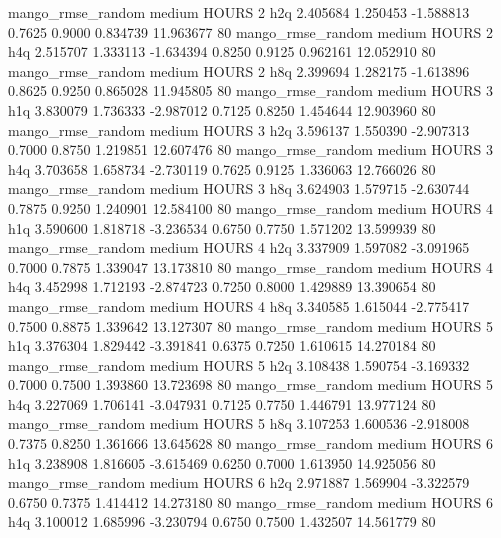 mango_rmse_random     medium    HOURS                 2                  h2q  2.405684 1.250453 -1.588813 0.7625 0.9000  0.834739   11.963677 80
mango_rmse_random     medium    HOURS                 2                  h4q  2.515707 1.333113 -1.634394 0.8250 0.9125  0.962161   12.052910 80
mango_rmse_random     medium    HOURS                 2                  h8q  2.399694 1.282175 -1.613896 0.8625 0.9250  0.865028   11.945805 80
mango_rmse_random     medium    HOURS                 3                  h1q  3.830079 1.736333 -2.987012 0.7125 0.8250  1.454644   12.903960 80
mango_rmse_random     medium    HOURS                 3                  h2q  3.596137 1.550390 -2.907313 0.7000 0.8750  1.219851   12.607476 80
mango_rmse_random     medium    HOURS                 3                  h4q  3.703658 1.658734 -2.730119 0.7625 0.9125  1.336063   12.766026 80
mango_rmse_random     medium    HOURS                 3                  h8q  3.624903 1.579715 -2.630744 0.7875 0.9250  1.240901   12.584100 80
mango_rmse_random     medium    HOURS                 4                  h1q  3.590600 1.818718 -3.236534 0.6750 0.7750  1.571202   13.599939 80
mango_rmse_random     medium    HOURS                 4                  h2q  3.337909 1.597082 -3.091965 0.7000 0.7875  1.339047   13.173810 80
mango_rmse_random     medium    HOURS                 4                  h4q  3.452998 1.712193 -2.874723 0.7250 0.8000  1.429889   13.390654 80
mango_rmse_random     medium    HOURS                 4                  h8q  3.340585 1.615044 -2.775417 0.7500 0.8875  1.339642   13.127307 80
mango_rmse_random     medium    HOURS                 5                  h1q  3.376304 1.829442 -3.391841 0.6375 0.7250  1.610615   14.270184 80
mango_rmse_random     medium    HOURS                 5                  h2q  3.108438 1.590754 -3.169332 0.7000 0.7500  1.393860   13.723698 80
mango_rmse_random     medium    HOURS                 5                  h4q  3.227069 1.706141 -3.047931 0.7125 0.7750  1.446791   13.977124 80
mango_rmse_random     medium    HOURS                 5                  h8q  3.107253 1.600536 -2.918008 0.7375 0.8250  1.361666   13.645628 80
mango_rmse_random     medium    HOURS                 6                  h1q  3.238908 1.816605 -3.615469 0.6250 0.7000  1.613950   14.925056 80
mango_rmse_random     medium    HOURS                 6                  h2q  2.971887 1.569904 -3.322579 0.6750 0.7375  1.414412   14.273180 80
mango_rmse_random     medium    HOURS                 6                  h4q  3.100012 1.685996 -3.230794 0.6750 0.7500  1.432507   14.561779 80
